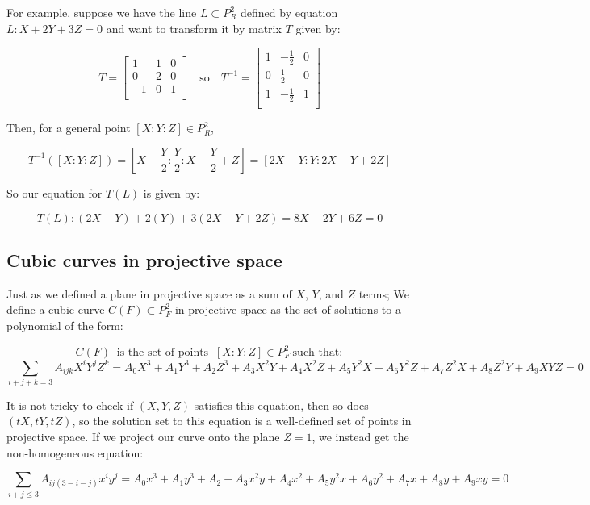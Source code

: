 \documentclass{article}
\begin{document}
For example, suppose we have the line $L \subset P_R^2$ defined by equation $L : X + 2Y + 3Z = 0$ and want to transform it by matrix $T$ given by:

\[T = 
\begin{bmatrix}
    1  & 1 & 0\\
    0  & 2 & 0\\
    -1 & 0 & 1\\
\end{bmatrix}
\quad 
\text{so}
\quad
T^{-1} = 
\begin{bmatrix}
    1  & -\frac{1}{2} & 0\\
    0  &  \frac{1}{2} & 0\\
    1 &  -\frac{1}{2} & 1\\
\end{bmatrix}
\]

Then, for a general point $[X : Y : Z] \in P_R^2$, 

\[T^{-1}([X : Y : Z]) = [X - \frac{Y}{2} : \frac{Y}{2} : X - \frac{Y}{2} + Z] = [2X - Y : Y : 2X - Y + 2Z]\]

So our equation for $T(L)$ is given by:

\[T(L) : (2X - Y) + 2(Y) + 3(2X - Y + 2Z) = 8X - 2Y + 6Z = 0\]




\subsection{Cubic curves in projective space}

Just as we defined a plane in projective space as a sum of $X$, $Y$, and $Z$ terms; We define a cubic curve $C(F) \subset P_F^2$ in projective space as the set of solutions to a polynomial of the form:

\[C(F) \ \text{ is the set of points } \ [X : Y : Z]\in P_F^2 \ \text{such that}:\]
\[\sum_{i + j + k = 3} A_{ijk}X^i Y^j Z^k = A_0 X^3 + A_1 Y^3 + A_2 Z^3 + A_3 X^2Y + A_4 X^2Z + A_5 Y^2X + A_6 Y^2Z + A_7 Z^2X + A_8 Z^2Y + A_9 XYZ = 0\]

It is not tricky to check if $(X, Y, Z)$ satisfies this equation, then so does $(tX, tY, tZ)$, so the solution set to this equation is a well-defined set of points in projective space. If we project our curve onto the plane $Z = 1$, we instead get the non-homogeneous equation:

\[\sum_{i + j \leq 3} A_{ij(3-i-j)}x^i y^j = A_0 x^3 + A_1 y^3 + A_2 + A_3 x^2y + A_4 x^2 + A_5 y^2 x + A_6 y^2 + A_7 x + A_8 y + A_9 xy = 0 \]
\end{document}
